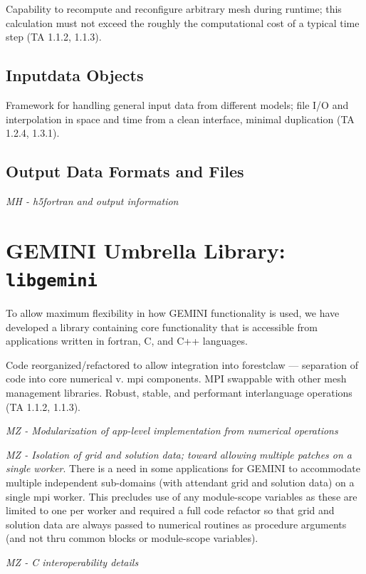 \documentclass[11pt,letterpaper]{article}
\begin{document}
Capability to recompute and reconfigure arbitrary mesh during runtime; this calculation must not exceed the roughly the computational cost of a typical time step (TA 1.1.2, 1.1.3).

\subsection{Inputdata Objects}

Framework for handling general input data from different models; file I/O and interpolation in space and time from a clean interface, minimal duplication (TA 1.2.4, 1.3.1).


\subsection{Output Data Formats and Files}

\emph{MH - h5fortran and output information}


\section{GEMINI Umbrella Library:  \texttt{libgemini}}

To allow maximum flexibility in how GEMINI functionality is used, we have developed a library containing core functionality that is accessible from applications written in fortran, C, and C++ languages.  

Code reorganized/refactored to allow integration into forestclaw — separation of code into core numerical v. mpi components.  MPI swappable with other mesh management libraries.  Robust, stable, and performant interlanguage operations (TA 1.1.2, 1.1.3).


\emph{MZ - Modularization of app-level implementation from numerical operations}

\emph{MZ - Isolation of grid and solution data; toward allowing multiple patches on a single worker}.  There is a need in some applications for GEMINI to accommodate multiple independent sub-domains (with attendant grid and solution data) on a single mpi worker.  This precludes use of any module-scope variables as these are limited to one per worker and required a full code refactor so that grid and solution data are always passed to numerical routines as procedure arguments (and not thru common blocks or module-scope variables).  

\emph{MZ - C interoperability details}
\end{document}
